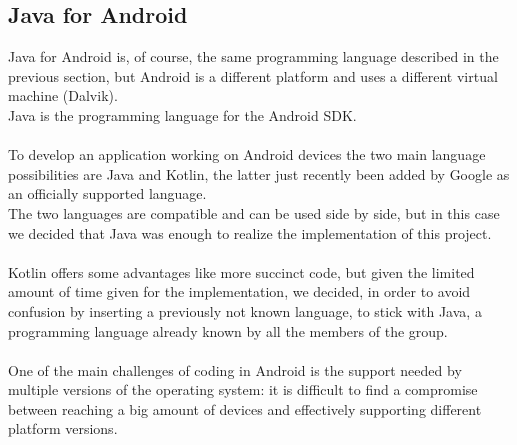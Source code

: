 \subsection{Java for Android}
\label{subsect:Java for Android}
Java for Android is, of course, the same programming language described in the previous section, but Android is a different platform and uses a different virtual machine (Dalvik). \\
Java is the programming language for the Android SDK. \\\\
To develop an application working on Android devices the two main language possibilities are Java and Kotlin, the latter just recently been added by Google as an officially supported language.\\
The two languages are compatible and can be used side by side, but in this case we decided that Java was enough to realize the implementation of this project.\\\\
Kotlin offers some advantages like more succinct code, but given the limited amount of time given for the implementation, we decided, in order to avoid confusion by inserting a previously not known language, to stick with Java, a programming language already known by all the members of the group. \\\\
One of the main challenges of coding in Android is the support needed by multiple versions of the operating system: it is difficult to find a compromise between reaching a big amount of devices and effectively supporting different platform versions.

